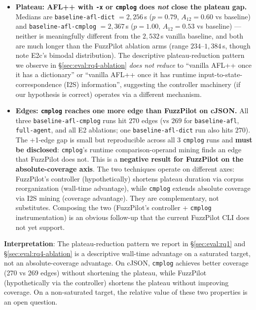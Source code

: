 \documentclass[11pt]{article}
\begin{document}
\begin{itemize}
\item \textbf{Plateau: AFL++ with \texttt{-x} or \texttt{cmplog}
does \emph{not} close the plateau gap.} Medians are
\texttt{baseline-afl-dict} $=2{,}256$\,s ($p{=}0.79$,
$A_{12}{=}0.60$ vs baseline) and \texttt{baseline-afl-cmplog}
$=2{,}367$\,s ($p{=}1.00$, $A_{12}{=}0.53$ vs baseline) ---
neither is meaningfully different from the
$2{,}532$\,s vanilla baseline, and both are much longer than the
FuzzPilot ablation arms (range $234$--$1{,}384$\,s, though note
E2c's bimodal distribution). The descriptive plateau-reduction
pattern we observe in \S\ref{sec:eval:rq4-ablation} \emph{does not
reduce} to ``vanilla AFL++ once it has a dictionary'' or ``vanilla
AFL++ once it has runtime input-to-state-correspondence (I2S)
information'', suggesting the
controller machinery (if our hypothesis is correct) operates via a
different mechanism.

\item \textbf{Edges: \texttt{cmplog} reaches one more edge than
FuzzPilot on cJSON.} All three \texttt{baseline-\allowbreak afl-\allowbreak cmplog} runs hit
$270$ edges (vs $269$ for \texttt{baseline-\allowbreak afl}, \texttt{full-\allowbreak agent},
and all E2 ablations; one \texttt{baseline-\allowbreak afl-\allowbreak dict} run also hits
$270$). The +1-edge gap is small but reproducible across all 3
\texttt{cmplog} runs and \textbf{must be disclosed}:
\texttt{cmplog}'s runtime comparison-operand mining finds an edge
that FuzzPilot does not. This is a \textbf{negative result for
FuzzPilot on the absolute-coverage axis}. The two techniques operate
on different axes: FuzzPilot's controller (hypothetically) shortens
plateau duration via corpus reorganization (wall-time advantage),
while \texttt{cmplog} extends absolute coverage via I2S mining
(coverage advantage). They are complementary, not substitutes.
Composing the two (FuzzPilot's controller + \texttt{cmplog}
instrumentation) is an obvious follow-up that the current FuzzPilot
CLI does not yet support.
\end{itemize}

\textbf{Interpretation}: The plateau-reduction pattern we report in
\S\ref{sec:eval:rq1} and \S\ref{sec:eval:rq4-ablation} is a
descriptive wall-time advantage on a saturated target, not an
absolute-coverage advantage. On cJSON, \texttt{cmplog} achieves
better coverage (270 vs 269 edges) without shortening the plateau,
while FuzzPilot (hypothetically via the controller) shortens the
plateau without improving coverage. On a non-saturated target, the
relative value of these two properties is an open question.
\end{document}
